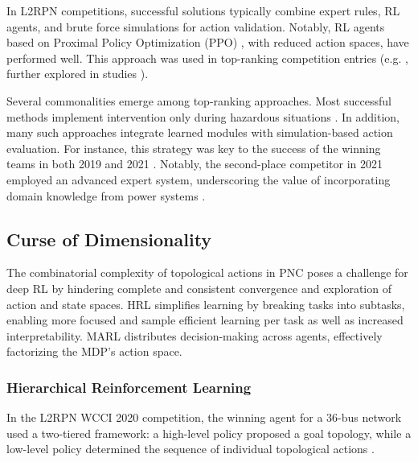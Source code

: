 In L2RPN competitions, successful solutions typically combine expert rules, RL agents, and brute force simulations for action validation. Notably, RL agents based on Proximal Policy Optimization (PPO) \cite{schulman2017proximal}, with reduced action spaces, have performed well. This approach was used in top-ranking competition entries (e.g. \cite{marot2021learning}, further explored in  studies \cite{lehna2023managing, manczak2023hierarchical, chauhan2023powrl}).

Several commonalities emerge among top-ranking approaches. Most successful methods implement intervention only during hazardous situations \cite{yoon2020winning, lan2020ai, manczak2023hierarchical, chauhan2023powrl, dorfer2022power, lehna2023managing}. 
In addition, many such approaches integrate learned modules with simulation-based action evaluation. For instance, this strategy was key to the success of the winning teams in both 2019 \cite{lan2020ai} and 2021 \cite{icapswinner}. 
Notably, the second-place competitor in 2021 employed an advanced expert system, underscoring the value of incorporating domain knowledge from power systems \cite{marot2022learning}. %

\subsection{Curse of Dimensionality}\label{sec:SRL}
The combinatorial complexity of topological actions in PNC poses a challenge for deep RL by hindering complete and consistent convergence and exploration of action and state spaces. HRL simplifies learning by breaking tasks into subtasks, enabling more focused and sample efficient learning per task as well as increased interpretability. MARL distributes decision-making across agents, effectively factorizing the MDP's action space.

\subsubsection{Hierarchical Reinforcement Learning}
In the L2RPN WCCI 2020 competition, the winning agent for a 36-bus network used a two-tiered framework: a high-level policy proposed a goal topology, while a low-level policy determined the sequence of individual topological actions \cite{yoon2020winning}.

